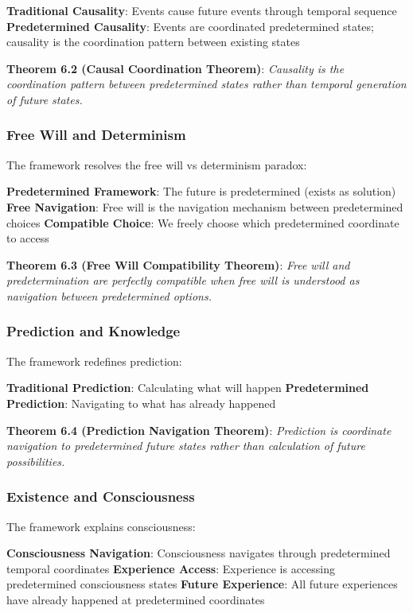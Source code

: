 \documentclass[12pt,a4paper]{article}
\theoremstyle{definition}
\begin{document}
{\textbf{Traditional Causality}: Events cause future events through temporal sequence
\textbf{Predetermined Causality}: Events are coordinated predetermined states; causality is the coordination pattern between existing states

\textbf{Theorem 6.2 (Causal Coordination Theorem)}: \textit{Causality is the coordination pattern between predetermined states rather than temporal generation of future states.}

\subsubsection{Free Will and Determinism}

The framework resolves the free will vs determinism paradox:

\textbf{Predetermined Framework}: The future is predetermined (exists as solution)
\textbf{Free Navigation}: Free will is the navigation mechanism between predetermined choices
\textbf{Compatible Choice}: We freely choose which predetermined coordinate to access

\textbf{Theorem 6.3 (Free Will Compatibility Theorem)}: \textit{Free will and predetermination are perfectly compatible when free will is understood as navigation between predetermined options.}

\subsubsection{Prediction and Knowledge}

The framework redefines prediction:

\textbf{Traditional Prediction}: Calculating what will happen
\textbf{Predetermined Prediction}: Navigating to what has already happened

\textbf{Theorem 6.4 (Prediction Navigation Theorem)}: \textit{Prediction is coordinate navigation to predetermined future states rather than calculation of future possibilities.}

\subsubsection{Existence and Consciousness}

The framework explains consciousness:

\textbf{Consciousness Navigation}: Consciousness navigates through predetermined temporal coordinates
\textbf{Experience Access}: Experience is accessing predetermined consciousness states
\textbf{Future Experience}: All future experiences have already happened at predetermined coordinates

}
\end{document}
